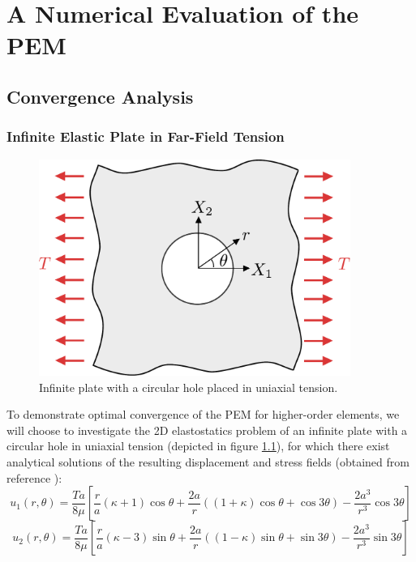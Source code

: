 \chapter{A Numerical Evaluation of the PEM} \label{ch:results}
%
\section{Convergence Analysis}

\subsection*{Infinite Elastic Plate in Far-Field Tension}

\begin{figure}[!h]
  \centering
  \includegraphics[width=4.0in]{figures/plate_with_hole.pdf}  \caption{Infinite plate with a circular hole placed in uniaxial tension.}
  \label{fig:plate_with_hole_problem}
\end{figure}
To demonstrate optimal convergence of the PEM for higher-order elements, we will choose to investigate the 2D elastostatics problem of an infinite plate with a circular hole in uniaxial tension (depicted in figure \ref{fig:plate_with_hole_problem}), for which there exist analytical solutions of the resulting displacement and stress fields (obtained from reference \cite{Wikiversity:17}):
\begin{equation}
  u_1 (r,\theta) = \frac{Ta}{8\mu} \left[ \frac{r}{a} (\kappa + 1) \cos \theta + \frac{2a}{r} ((1+\kappa) \cos \theta + \cos 3 \theta) - \frac{2a^3}{r^3} \cos 3 \theta \right]
\end{equation}
\begin{equation}
  u_2 (r,\theta) = \frac{Ta}{8\mu} \left[ \frac{r}{a} (\kappa - 3) \sin \theta + \frac{2a}{r} ((1-\kappa) \sin \theta + \sin 3 \theta) - \frac{2a^3}{r^3} \sin 3 \theta \right]
\end{equation}
